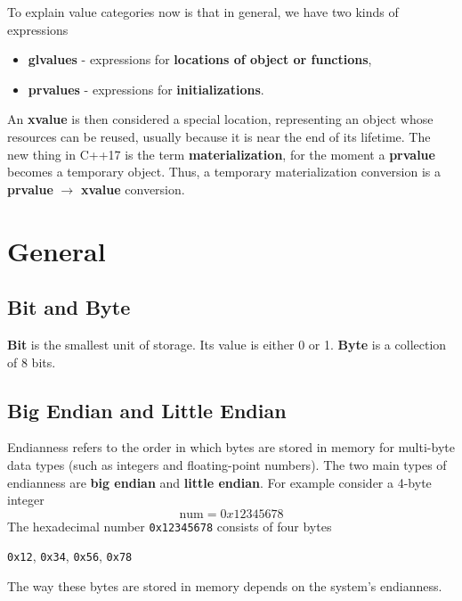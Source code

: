 \documentclass[../main]{subfiles}
\begin{document}
    To explain value categories now is that in general, we have two kinds of expressions
\begin{itemize}
    \item \textbf{glvalues} - expressions for \textbf{locations of object or functions},
    \item \textbf{prvalues} - expressions for \textbf{initializations}.
\end{itemize}
\noindent
An \textbf{xvalue} is then considered a special location, representing an object whose resources can be reused, usually because it is near the end of its lifetime.
The new thing in C++17 is the term \textbf{materialization}, for the moment a \textbf{prvalue} becomes a temporary object.
Thus, a temporary materialization conversion is a \textbf{prvalue} $\rightarrow$ \textbf{xvalue} conversion.\newline

\section{General}
\subsection{Bit and Byte}
\noindent
\textbf{Bit} is the smallest unit of storage. Its value is either 0 or 1.\newline
\textbf{Byte} is a collection of 8 bits.

\subsection{Big Endian and Little Endian}
    Endianness refers to the order in which bytes are stored in memory for multi-byte data types
(such as integers and floating-point numbers). The two main types of endianness are \textbf{big endian} and \textbf{little endian}. For example
consider a 4-byte integer
\begin{equation}
    \text{num} = 0x12345678
\end{equation}
The hexadecimal number \texttt{0x12345678} consists of four bytes
\begin{center}
\texttt{0x12}, \texttt{0x34}, \texttt{0x56}, \texttt{0x78}
\end{center}
The way these bytes are stored in memory depends on the system's endianness.
\end{document}
